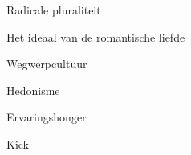 \documentclass[main.tex]{subfiles}
\begin{document}
\begin{examenvraag}
    \begin{vraag}
        Radicale pluraliteit
    \end{vraag}

    \begin{antwoord}

    \end{antwoord}
\end{examenvraag}


\begin{examenvraag}
    \begin{vraag}
        Het ideaal van de romantische liefde
    \end{vraag}

    \begin{antwoord}

    \end{antwoord}
\end{examenvraag}


\begin{examenvraag}
    \begin{vraag}
        Wegwerpcultuur
    \end{vraag}

    \begin{antwoord}

    \end{antwoord}
\end{examenvraag}


\begin{examenvraag}
    \begin{vraag}
        Hedonisme
    \end{vraag}

    \begin{antwoord}

    \end{antwoord}
\end{examenvraag}


\begin{examenvraag}
    \begin{vraag}
        Ervaringshonger
    \end{vraag}

    \begin{antwoord}

    \end{antwoord}
\end{examenvraag}


\begin{examenvraag}
    \begin{vraag}
        Kick
    \end{vraag}

    \begin{antwoord}

    \end{antwoord}
\end{examenvraag}
\end{document}
